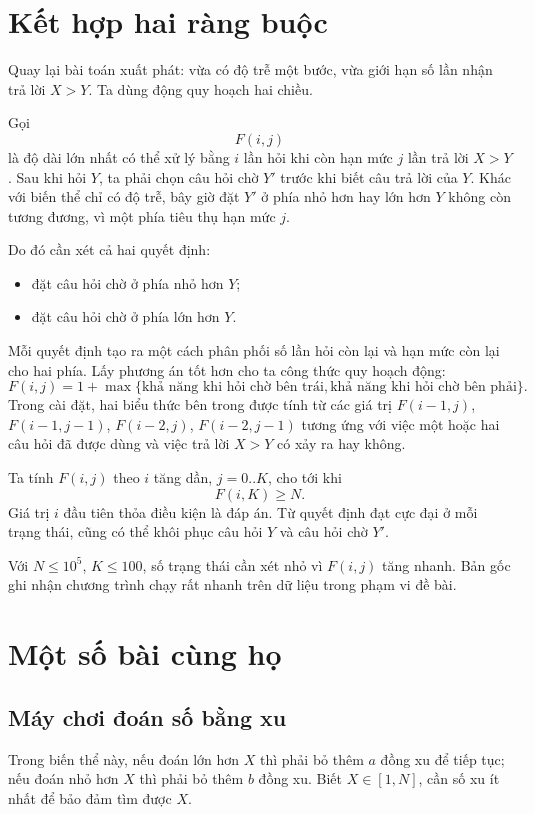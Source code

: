 \documentclass[11pt]{article}
\begin{document}
\section{Kết hợp hai ràng buộc}

Quay lại bài toán xuất phát: vừa có độ trễ một bước, vừa giới hạn số lần nhận
trả lời \(X>Y\). Ta dùng động quy hoạch hai chiều.

Gọi
\[
  F(i,j)
\]
là độ dài lớn nhất có thể xử lý bằng \(i\) lần hỏi khi còn hạn mức \(j\) lần
trả lời \(X>Y\). Sau khi hỏi \(Y\), ta phải chọn câu hỏi chờ \(Y'\) trước khi
biết câu trả lời của \(Y\). Khác với biến thể chỉ có độ trễ, bây giờ đặt
\(Y'\) ở phía nhỏ hơn hay lớn hơn \(Y\) không còn tương đương, vì một phía tiêu
thụ hạn mức \(j\).

Do đó cần xét cả hai quyết định:
\begin{itemize}
  \item đặt câu hỏi chờ ở phía nhỏ hơn \(Y\);
  \item đặt câu hỏi chờ ở phía lớn hơn \(Y\).
\end{itemize}
Mỗi quyết định tạo ra một cách phân phối số lần hỏi còn lại và hạn mức còn
lại cho hai phía. Lấy phương án tốt hơn cho ta công thức quy hoạch động:
\[
  F(i,j)=1+\max\{\text{khả năng khi hỏi chờ bên trái},
                 \text{khả năng khi hỏi chờ bên phải}\}.
\]
Trong cài đặt, hai biểu thức bên trong được tính từ các giá trị
\(F(i-1,j)\), \(F(i-1,j-1)\), \(F(i-2,j)\), \(F(i-2,j-1)\) tương ứng với việc
một hoặc hai câu hỏi đã được dùng và việc trả lời \(X>Y\) có xảy ra hay không.

Ta tính \(F(i,j)\) theo \(i\) tăng dần, \(j=0..K\), cho tới khi
\[
  F(i,K)\ge N.
\]
Giá trị \(i\) đầu tiên thỏa điều kiện là đáp án. Từ quyết định đạt cực đại ở
mỗi trạng thái, cũng có thể khôi phục câu hỏi \(Y\) và câu hỏi chờ \(Y'\).

Với \(N\le10^5\), \(K\le100\), số trạng thái cần xét nhỏ vì \(F(i,j)\) tăng
nhanh. Bản gốc ghi nhận chương trình chạy rất nhanh trên dữ liệu trong phạm vi
đề bài.

\section{Một số bài cùng họ}

\subsection{Máy chơi đoán số bằng xu}

Trong biến thể này, nếu đoán lớn hơn \(X\) thì phải bỏ thêm \(a\) đồng xu để
tiếp tục; nếu đoán nhỏ hơn \(X\) thì phải bỏ thêm \(b\) đồng xu. Biết
\(X\in[1,N]\), cần số xu ít nhất để bảo đảm tìm được \(X\).
\end{document}
